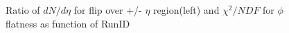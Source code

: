 	\begin{figure}[!hp]
		\begin{center}

        	\caption{Ratio of $dN/d\eta$ for flip over +/- $\eta$ region(left) and $\chi^2/NDF$ for $\phi$ flatness as function of RunID}
        	\label{dNdetaQA}
        \end{center}
    \end{figure}

